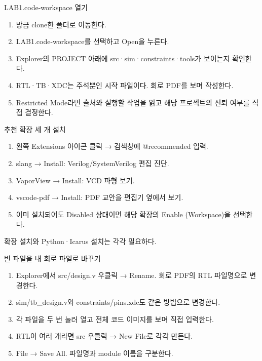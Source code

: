 \begin{frame}{LAB1.code-workspace 열기}\relax
\small
\begin{enumerate}\setlength{\itemsep}{0.22cm}
\item 방금 clone한 폴더로 이동한다.
\item LAB1.code-workspace를 선택하고 Open을 누른다.
\item Explorer의 PROJECT 아래에 src·sim·constraints·tools가 보이는지 확인한다.
\item RTL·TB·XDC는 주석뿐인 시작 파일이다. 회로 PDF를 보며 작성한다.
\item Restricted Mode라면 출처와 실행할 작업을 읽고 해당 프로젝트의 신뢰 여부를 직접 결정한다.
\end{enumerate}

\end{frame}

\begin{frame}{추천 확장 세 개 설치}\relax
\small
\begin{enumerate}\setlength{\itemsep}{0.22cm}
\item 왼쪽 Extensions 아이콘 클릭 → 검색창에 @recommended 입력.
\item slang → Install: Verilog/SystemVerilog 편집 진단.
\item VaporView → Install: VCD 파형 보기.
\item vscode-pdf → Install: PDF 교안을 편집기 옆에서 보기.
\item 이미 설치되어도 Disabled 상태이면 해당 확장의 Enable (Workspace)을 선택한다.
\end{enumerate}
확장 설치와 Python·Icarus 설치는 각각 필요하다.\par
\end{frame}

\begin{frame}{빈 파일을 내 회로 파일로 바꾸기}\relax
\small
\begin{enumerate}\setlength{\itemsep}{0.22cm}
\item Explorer에서 src/design.v 우클릭 → Rename. 회로 PDF의 RTL 파일명으로 변경한다.
\item sim/tb\_design.v와 constraints/pins.xdc도 같은 방법으로 변경한다.
\item 각 파일을 두 번 눌러 열고 전체 코드 이미지를 보며 직접 입력한다.
\item RTL이 여러 개라면 src 우클릭 → New File로 각각 만든다.
\item File → Save All. 파일명과 module 이름을 구분한다.
\end{enumerate}

\end{frame}

